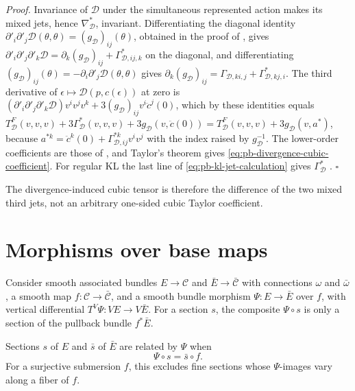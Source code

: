 \noindent\emph{Proof.}
Invariance of \(\mathscr D\) under the simultaneous represented action makes its mixed jets, hence
\(\nabla^*_{\mathscr D}\), invariant. Differentiating the diagonal identity
\(\partial'_i\partial'_j\mathscr D(\theta,\theta)=(g_{\mathscr D})_{ij}(\theta)\), obtained in the proof
of , gives
\(\partial'_i\partial'_j\partial'_k\mathscr D=\partial_k(g_{\mathscr D})_{ij}+\Gamma^*_{\mathscr D,ij,k}\)
on the diagonal, and differentiating
\((g_{\mathscr D})_{ij}(\theta)=-\partial_i\partial'_j\mathscr D(\theta,\theta)\) gives
\(\partial_k(g_{\mathscr D})_{ij}=\Gamma_{\mathscr D,ki,j}+\Gamma^*_{\mathscr D,kj,i}\). The third
derivative of \(\epsilon\mapsto\mathscr D(p,c(\epsilon))\) at zero is
\((\partial'_i\partial'_j\partial'_k\mathscr D)v^iv^jv^k+3(g_{\mathscr D})_{ij}v^i\ddot c^j(0)\), which by
these identities equals
\(T^F_{\mathscr D}(v,v,v)+3\Gamma^*_{\mathscr D}(v,v,v)+3g_{\mathscr D}(v,\ddot c(0))
=T^F_{\mathscr D}(v,v,v)+3g_{\mathscr D}(v,a^*)\), because
\(a^{*k}=\ddot c^k(0)+\Gamma^{*k}_{\mathscr D,ij}v^iv^j\) with the index raised by
\(g_{\mathscr D}^{-1}\). The lower-order coefficients are those of
, and Taylor's theorem gives
\eqref{eq:pb-divergence-cubic-coefficient}. For regular KL the last line of
\eqref{eq:pb-kl-jet-calculation} gives \(\Gamma^*_{\mathscr D}\) \citep{AmariNagaoka2000}.
\hfill$\square$

The divergence-induced cubic tensor is therefore the difference of the two mixed third jets, not an
arbitrary one-sided cubic Taylor coefficient.

\section{Morphisms over base maps}
\label{sec:pb-coarse-naturality}

Consider smooth associated bundles \(E\to\mathcal C\) and \(\bar E\to\bar{\mathcal C}\) with
connections \(\omega\) and \(\bar\omega\), a smooth map \(f:\mathcal C\to\bar{\mathcal C}\), and a
smooth bundle morphism \(\Psi:E\to\bar E\) over \(f\), with vertical differential
\(T^V\Psi:VE\to V\bar E\). For a section \(s\), the composite \(\Psi\circ s\) is only a section of the
pullback bundle \(f^*\bar E\).

Sections \(s\) of \(E\) and \(\bar s\) of \(\bar E\) are related by \(\Psi\) when
\begin{equation}
\Psi\circ s=\bar s\circ f.
\label{eq:pb-coarse-related-sections}
\end{equation}
For a surjective submersion \(f\), this excludes fine sections whose \(\Psi\)-images vary along a
fiber of \(f\).

